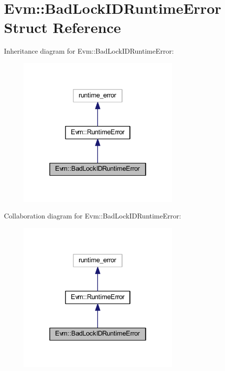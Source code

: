 \hypertarget{struct_evm_1_1_bad_lock_i_d_runtime_error}{}\section{Evm\+:\+:Bad\+Lock\+I\+D\+Runtime\+Error Struct Reference}
\label{struct_evm_1_1_bad_lock_i_d_runtime_error}


Inheritance diagram for Evm\+:\+:Bad\+Lock\+I\+D\+Runtime\+Error\+:
\nopagebreak
\begin{figure}[H]
\begin{center}
\leavevmode
\includegraphics[width=226pt]{struct_evm_1_1_bad_lock_i_d_runtime_error__inherit__graph}
\end{center}
\end{figure}


Collaboration diagram for Evm\+:\+:Bad\+Lock\+I\+D\+Runtime\+Error\+:
\nopagebreak
\begin{figure}[H]
\begin{center}
\leavevmode
\includegraphics[width=226pt]{struct_evm_1_1_bad_lock_i_d_runtime_error__coll__graph}
\end{center}
\end{figure}
